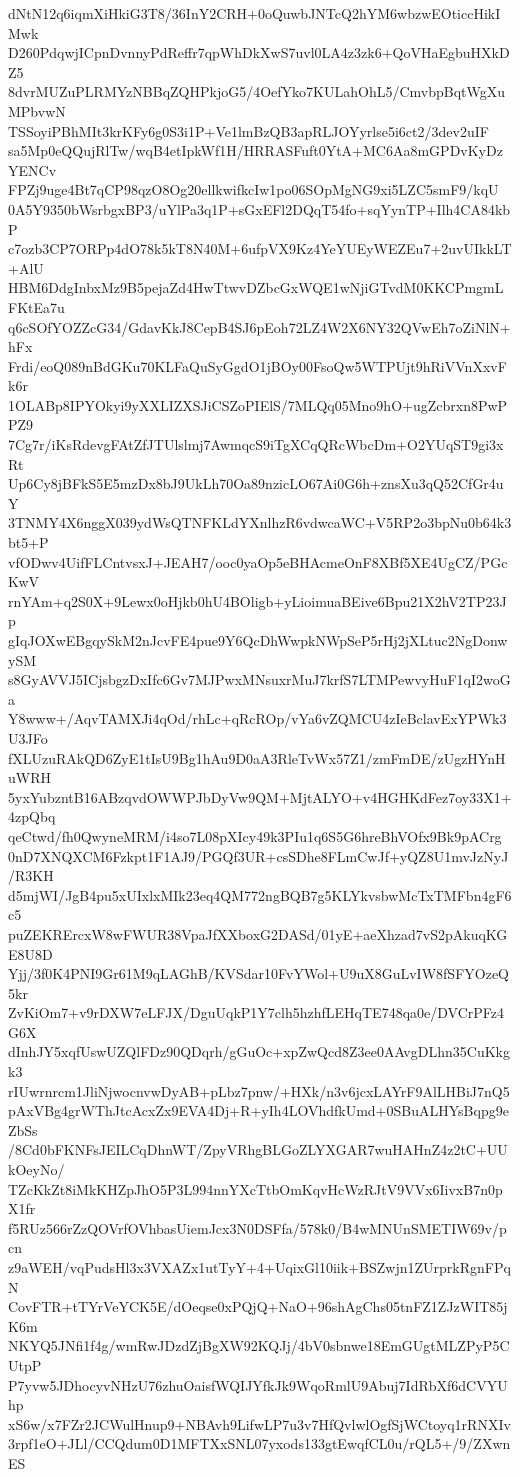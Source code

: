 dNtN12q6iqmXiHkiG3T8/36InY2CRH+0oQuwbJNTcQ2hYM6wbzwEOticcHikIMwk
D260PdqwjICpnDvnnyPdReffr7qpWhDkXwS7uvl0LA4z3zk6+QoVHaEgbuHXkDZ5
8dvrMUZuPLRMYzNBBqZQHPkjoG5/4OefYko7KULahOhL5/CmvbpBqtWgXuMPbvwN
TSSoyiPBhMIt3krKFy6g0S3i1P+Ve1lmBzQB3apRLJOYyrlse5i6ct2/3dev2uIF
sa5Mp0eQQujRlTw/wqB4etIpkWf1H/HRRASFuft0YtA+MC6Aa8mGPDvKyDzYENCv
FPZj9uge4Bt7qCP98qzO8Og20ellkwifkcIw1po06SOpMgNG9xi5LZC5smF9/kqU
0A5Y9350bWsrbgxBP3/uYlPa3q1P+sGxEFl2DQqT54fo+sqYynTP+Ilh4CA84kbP
c7ozb3CP7ORPp4dO78k5kT8N40M+6ufpVX9Kz4YeYUEyWEZEu7+2uvUIkkLT+AlU
HBM6DdgInbxMz9B5pejaZd4HwTtwvDZbcGxWQE1wNjiGTvdM0KKCPmgmLFKtEa7u
q6cSOfYOZZcG34/GdavKkJ8CepB4SJ6pEoh72LZ4W2X6NY32QVwEh7oZiNlN+hFx
Frdi/eoQ089nBdGKu70KLFaQuSyGgdO1jBOy00FsoQw5WTPUjt9hRiVVnXxvFk6r
1OLABp8IPYOkyi9yXXLIZXSJiCSZoPIElS/7MLQq05Mno9hO+ugZcbrxn8PwPPZ9
7Cg7r/iKsRdevgFAtZfJTUlslmj7AwmqcS9iTgXCqQRcWbcDm+O2YUqST9gi3xRt
Up6Cy8jBFkS5E5mzDx8bJ9UkLh70Oa89nzicLO67Ai0G6h+znsXu3qQ52CfGr4uY
3TNMY4X6nggX039ydWsQTNFKLdYXnlhzR6vdwcaWC+V5RP2o3bpNu0b64k3bt5+P
vfODwv4UifFLCntvsxJ+JEAH7/ooc0yaOp5eBHAcmeOnF8XBf5XE4UgCZ/PGcKwV
rnYAm+q2S0X+9Lewx0oHjkb0hU4BOligb+yLioimuaBEive6Bpu21X2hV2TP23Jp
gIqJOXwEBgqySkM2nJcvFE4pue9Y6QcDhWwpkNWpSeP5rHj2jXLtuc2NgDonwySM
s8GyAVVJ5ICjsbgzDxIfc6Gv7MJPwxMNsuxrMuJ7krfS7LTMPewvyHuF1qI2woGa
Y8www+/AqvTAMXJi4qOd/rhLc+qRcROp/vYa6vZQMCU4zIeBclavExYPWk3U3JFo
fXLUzuRAkQD6ZyE1tIsU9Bg1hAu9D0aA3RleTvWx57Z1/zmFmDE/zUgzHYnHuWRH
5yxYubzntB16ABzqvdOWWPJbDyVw9QM+MjtALYO+v4HGHKdFez7oy33X1+4zpQbq
qeCtwd/fh0QwyneMRM/i4so7L08pXIcy49k3PIu1q6S5G6hreBhVOfx9Bk9pACrg
0nD7XNQXCM6Fzkpt1F1AJ9/PGQf3UR+csSDhe8FLmCwJf+yQZ8U1mvJzNyJ/R3KH
d5mjWI/JgB4pu5xUIxlxMIk23eq4QM772ngBQB7g5KLYkvsbwMcTxTMFbn4gF6c5
puZEKRErcxW8wFWUR38VpaJfXXboxG2DASd/01yE+aeXhzad7vS2pAkuqKGE8U8D
Yjj/3f0K4PNI9Gr61M9qLAGhB/KVSdar10FvYWol+U9uX8GuLvIW8fSFYOzeQ5kr
ZvKiOm7+v9rDXW7eLFJX/DguUqkP1Y7clh5hzhfLEHqTE748qa0e/DVCrPFz4G6X
dInhJY5xqfUswUZQlFDz90QDqrh/gGuOc+xpZwQcd8Z3ee0AAvgDLhn35CuKkgk3
rIUwrnrcm1JliNjwocnvwDyAB+pLbz7pnw/+HXk/n3v6jcxLAYrF9AlLHBiJ7nQ5
pAxVBg4grWThJtcAcxZx9EVA4Dj+R+yIh4LOVhdfkUmd+0SBuALHYsBqpg9eZbSs
/8Cd0bFKNFsJEILCqDhnWT/ZpyVRhgBLGoZLYXGAR7wuHAHnZ4z2tC+UUkOeyNo/
TZcKkZt8iMkKHZpJhO5P3L994nnYXcTtbOmKqvHcWzRJtV9VVx6IivxB7n0pX1fr
f5RUz566rZzQOVrfOVhbasUiemJcx3N0DSFfa/578k0/B4wMNUnSMETIW69v/pcn
z9aWEH/vqPudsHl3x3VXAZx1utTyY+4+UqixGl10iik+BSZwjn1ZUrprkRgnFPqN
CovFTR+tTYrVeYCK5E/dOeqse0xPQjQ+NaO+96shAgChs05tnFZ1ZJzWIT85jK6m
NKYQ5JNfi1f4g/wmRwJDzdZjBgXW92KQJj/4bV0sbnwe18EmGUgtMLZPyP5CUtpP
P7yvw5JDhocyvNHzU76zhuOaisfWQIJYfkJk9WqoRmlU9Abuj7IdRbXf6dCVYUhp
xS6w/x7FZr2JCWulHnup9+NBAvh9LifwLP7u3v7HfQvlwlOgfSjWCtoyq1rRNXIv
3rpf1eO+JLl/CCQdum0D1MFTXxSNL07yxods133gtEwqfCL0u/rQL5+/9/ZXwnES
